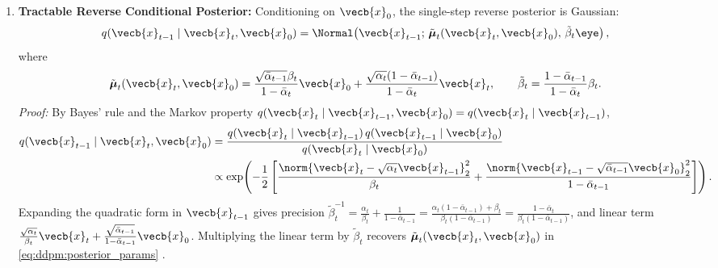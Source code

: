 \documentclass[../../../../master.tex]{subfiles}
\begin{document}
\begin{coremath}
\begin{enumerate}
  \item \textbf{Tractable Reverse Conditional Posterior:} Conditioning on $\vecb{x}_0$, the single-step reverse posterior is Gaussian:
  \begin{equation}\label{eq:ddpm:reverse_posterior}
    q(\vecb{x}_{t-1} \mid \vecb{x}_t, \vecb{x}_0) = \Normal\!\left(\vecb{x}_{t-1};\, \tilde{\boldsymbol{\mu}}_t(\vecb{x}_t, \vecb{x}_0),\, \tilde{\beta}_t \eye\right),
  \end{equation}
  where
  \begin{equation}\label{eq:ddpm:posterior_params}
    \tilde{\boldsymbol{\mu}}_t(\vecb{x}_t, \vecb{x}_0) = \frac{\sqrt{\bar{\alpha}_{t-1}}\beta_t}{1 - \bar{\alpha}_t}\vecb{x}_0 + \frac{\sqrt{\alpha_t}(1 - \bar{\alpha}_{t-1})}{1 - \bar{\alpha}_t}\vecb{x}_t, \qquad \tilde{\beta}_t = \frac{1 - \bar{\alpha}_{t-1}}{1 - \bar{\alpha}_t}\beta_t.
  \end{equation}
  \emph{Proof:} By Bayes' rule and the Markov property $q(\vecb{x}_t \mid \vecb{x}_{t-1}, \vecb{x}_0) = q(\vecb{x}_t \mid \vecb{x}_{t-1})$,
  \begin{align*}
    q(\vecb{x}_{t-1} \mid \vecb{x}_t, \vecb{x}_0) &= \frac{q(\vecb{x}_t \mid \vecb{x}_{t-1})\,q(\vecb{x}_{t-1} \mid \vecb{x}_0)}{q(\vecb{x}_t \mid \vecb{x}_0)} \\
    &\propto \exp\!\left(-\frac{1}{2}\left[\frac{\norm{\vecb{x}_t - \sqrt{\alpha_t}\vecb{x}_{t-1}}_2^2}{\beta_t} + \frac{\norm{\vecb{x}_{t-1} - \sqrt{\bar{\alpha}_{t-1}}\vecb{x}_0}_2^2}{1 - \bar{\alpha}_{t-1}}\right]\right).
  \end{align*}
  Expanding the quadratic form in $\vecb{x}_{t-1}$ gives precision $\tilde{\beta}_t^{-1} = \frac{\alpha_t}{\beta_t} + \frac{1}{1-\bar{\alpha}_{t-1}} = \frac{\alpha_t(1-\bar{\alpha}_{t-1}) + \beta_t}{\beta_t(1-\bar{\alpha}_{t-1})} = \frac{1 - \bar{\alpha}_t}{\beta_t(1-\bar{\alpha}_{t-1})}$, and linear term $\frac{\sqrt{\alpha_t}}{\beta_t}\vecb{x}_t + \frac{\sqrt{\bar{\alpha}_{t-1}}}{1-\bar{\alpha}_{t-1}}\vecb{x}_0$. Multiplying the linear term by $\tilde{\beta}_t$ recovers $\tilde{\boldsymbol{\mu}}_t(\vecb{x}_t, \vecb{x}_0)$ in \eqref{eq:ddpm:posterior_params}  .
\end{enumerate}
\end{coremath}
\end{document}

